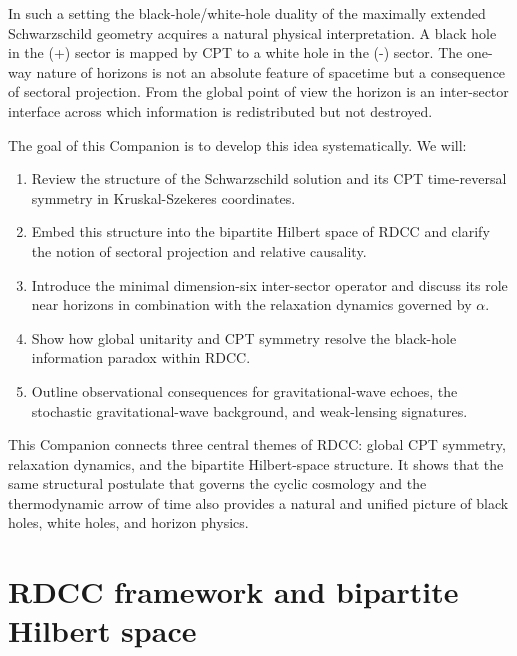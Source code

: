\documentclass[11pt,a4paper]{article}
\begin{document}
In such a setting the black-hole/white-hole duality of the maximally extended Schwarzschild geometry acquires a natural physical interpretation. A black hole in the (+) sector is mapped by CPT to a white hole in the (-) sector. The one-way nature of horizons is not an absolute feature of spacetime but a consequence of sectoral projection. From the global point of view the horizon is an inter-sector interface across which information is redistributed but not destroyed.

The goal of this Companion is to develop this idea systematically. We will:
\begin{enumerate}
    \item Review the structure of the Schwarzschild solution and its CPT time-reversal symmetry in Kruskal-Szekeres coordinates.
    \item Embed this structure into the bipartite Hilbert space of RDCC and clarify the notion of sectoral projection and relative causality.
    \item Introduce the minimal dimension-six inter-sector operator and discuss its role near horizons in combination with the relaxation dynamics governed by \(\alpha\).
    \item Show how global unitarity and CPT symmetry resolve the black-hole information paradox within RDCC.
    \item Outline observational consequences for gravitational-wave echoes, the stochastic gravitational-wave background, and weak-lensing signatures.
\end{enumerate}

This Companion connects three central themes of RDCC: global CPT symmetry, relaxation dynamics, and the bipartite Hilbert-space structure. It shows that the same structural postulate that governs the cyclic cosmology and the thermodynamic arrow of time also provides a natural and unified picture of black holes, white holes, and horizon physics.

\section{RDCC framework and bipartite Hilbert space}
\end{document}
